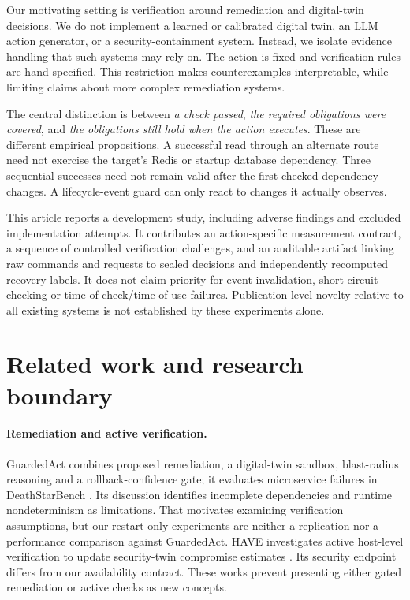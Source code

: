 \documentclass[11pt]{article}
\begin{document}
Our motivating setting is verification around remediation and digital-twin decisions. We do not implement a learned or calibrated digital twin, an LLM action generator, or a security-containment system. Instead, we isolate evidence handling that such systems may rely on. The action is fixed and verification rules are hand specified. This restriction makes counterexamples interpretable, while limiting claims about more complex remediation systems.

The central distinction is between \emph{a check passed}, \emph{the required obligations were covered}, and \emph{the obligations still hold when the action executes}. These are different empirical propositions. A successful read through an alternate route need not exercise the target's Redis or startup database dependency. Three sequential successes need not remain valid after the first checked dependency changes. A lifecycle-event guard can only react to changes it actually observes.

This article reports a development study, including adverse findings and excluded implementation attempts. It contributes an action-specific measurement contract, a sequence of controlled verification challenges, and an auditable artifact linking raw commands and requests to sealed decisions and independently recomputed recovery labels. It does not claim priority for event invalidation, short-circuit checking or time-of-check/time-of-use failures. Publication-level novelty relative to all existing systems is not established by these experiments alone.

\section{Related work and research boundary}
\paragraph{Remediation and active verification.}
GuardedAct combines proposed remediation, a digital-twin sandbox, blast-radius reasoning and a rollback-confidence gate; it evaluates microservice failures in DeathStarBench \cite{guarded}. Its discussion identifies incomplete dependencies and runtime nondeterminism as limitations. That motivates examining verification assumptions, but our restart-only experiments are neither a replication nor a performance comparison against GuardedAct. HAVE investigates active host-level verification to update security-twin compromise estimates \cite{have}. Its security endpoint differs from our availability contract. These works prevent presenting either gated remediation or active checks as new concepts.
\end{document}
